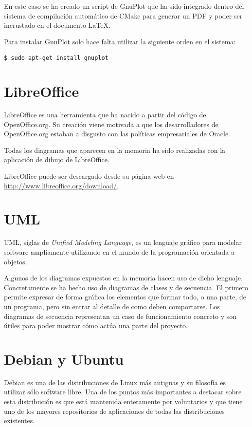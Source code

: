 En este caso se ha creado un script de GnuPlot que ha sido integrado dentro del sistema de compilación automático de CMake para generar un PDF y poder ser incrustado en el documento \LaTeX.

Para instalar GnuPlot solo hace falta utilizar la siguiente orden en el sistema:

\begin{verbatim}
$ sudo apt-get install gnuplot
\end{verbatim}

\section{LibreOffice}

LibreOffice es una herramienta que ha nacido a partir del código de OpenOffice.org. Su creación viene motivada a que los desarrolladores de OpenOffice.org estaban a disgusto con las políticas empresariales de Oracle.

Todas los diagramas que aparecen en la memoria ha sido realizadas con la aplicación de dibujo de LibreOffice.

LibreOffice puede ser descargado desde su página web en \url{http://www.libreoffice.org/download/}.

\section{UML}

UML, siglas de \emph{Unified Modeling Language}, es un lenguaje gráfico para modelar software ampliamente utilizando en el mundo de la programación orientada a objetos.

Algunos de los diagramas expuestos en la memoria hacen uso de dicho lenguaje. Concretamente se ha hecho uso de diagramas de clases y de secuencia. El primero permite expresar de forma gráfica los elementos que formar todo, o una parte, de un programa, pero sin entrar al detalle de como deben comportarse. Los diagramas de secuencia representan un caso de funcionamiento concreto y son útiles para poder mostrar cómo actúa una parte del proyecto.

\section{Debian y Ubuntu}

Debian es una de las distribuciones de Linux más antiguas y su filosofía es utilizar sólo software libre. Una de los puntos más importantes a destacar sobre esta distribución es que está mantenida enteramente por voluntarios y que tiene uno de los mayores repositorios de aplicaciones de todas las distribuciones existentes.

